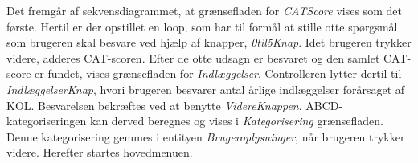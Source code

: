 Det fremgår af sekvensdiagrammet, at grænsefladen for \textit{CATScore} vises som det første. Hertil er der opstillet en loop, som har til formål at stille otte spørgsmål som brugeren skal besvare ved hjælp af knapper, \textit{0til5Knap}. Idet brugeren trykker videre, adderes CAT-scoren. Efter de otte udsagn er besvaret og den samlet CAT-score er fundet, vises grænsefladen for \textit{Indlæggelser}. Controlleren lytter dertil til \textit{IndlæggelserKnap}, hvori brugeren besvarer antal årlige indlæggelser forårsaget af KOL. Besvarelsen bekræftes ved at benytte \textit{VidereKnappen}. ABCD-kategoriseringen kan derved beregnes og vises i \textit{Kategorisering} grænsefladen. Denne kategorisering gemmes i entityen \textit{Brugeroplysninger}, når brugeren trykker videre. Herefter startes hovedmenuen.
